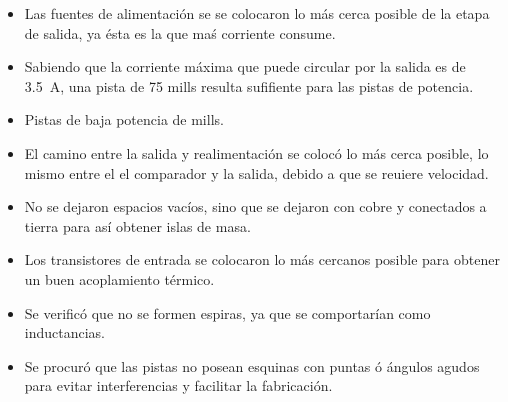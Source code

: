 \begin{itemize}
	\item Las fuentes de alimentación se se colocaron lo más cerca posible de la etapa de salida, ya ésta es la que maś corriente consume.
	\item Sabiendo que la corriente máxima que puede circular por la salida es de \SI{3.5}{\ampere}, una pista de 75 mills resulta sufifiente para las pistas de potencia.
	\item Pistas de baja potencia de mills.
	\item El camino entre la salida y realimentación se colocó lo más cerca posible, lo mismo entre el el comparador y la salida, debido a que se reuiere velocidad. 
	\item No se dejaron espacios vacíos, sino que se dejaron con cobre y conectados a tierra para así obtener islas de masa.
	\item Los transistores de entrada se colocaron lo más cercanos posible para obtener un buen acoplamiento térmico.
	\item Se verificó que no se formen espiras, ya que se comportarían como inductancias.
	\item Se procuró que las pistas no posean esquinas con puntas ó ángulos agudos para evitar interferencias y facilitar la fabricación.

\end{itemize}
